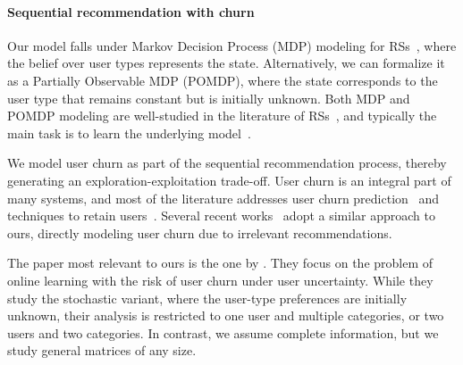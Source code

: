 \paragraph{Sequential recommendation with churn}
Our model falls under Markov Decision Process (MDP) modeling for RSs~\cite{an-mdp-based-recommender-system}, where the belief over user types represents the state. Alternatively, we can formalize it as a Partially Observable MDP (POMDP), where the state corresponds to the user type that remains constant but is initially unknown. Both MDP and POMDP modeling are well-studied in the literature of RSs~\cite{optimal-recommendation-to-users-that-react-online-learning-for-a-class-of-pomdps, interactive-recommendation-with-user-specific-deep-reinforcement-learning, recommendation-as-a-stochastic-sequential-decision-problem}, and typically the main task is to learn the underlying model~\cite{empirical-evaluation-of-gated-recurrent-neural-networks-on-sequence-modeling, usage-based-web-recommendations-a-reinforcement-learning-approach}.

We model user churn as part of the sequential recommendation process, thereby generating an exploration-exploitation trade-off. User churn is an integral part of many systems, and most of the literature addresses user churn prediction~\cite{user-retention-a-causal-approach-with-triple-task-modeling,quantifying-and-leveraging-user-fatigue-for-interventions-in-recommender-systems} and techniques to retain users~\cite{e-government-deep-recommendation-system-based-on-user-churn,surrogate-for-long-term-user-experience-in-recommender-systems}. Several recent works~\cite {maximizing-cumulative-user-engagement-in-sequential-recommendation-an-online-optimization-perspective, returning-is-believing-optimizing-long-term-user-engagement-in-recommender-systems, partially-observable-markov-decision-process-for-recommender-systems, cao2020fatigue} adopt a similar approach to ours, directly modeling user churn due to irrelevant recommendations. 


The paper most relevant to ours is the one by \citet{modeling-attrition-in-recommender-systems-with-departing-bandits}. They focus on the problem of online learning with the risk of user churn under user uncertainty. While they study the stochastic variant, where the user-type preferences are initially unknown, their analysis is restricted to one user and multiple categories, or two users and two categories. In contrast, we assume complete information, but we study general matrices of any size.


